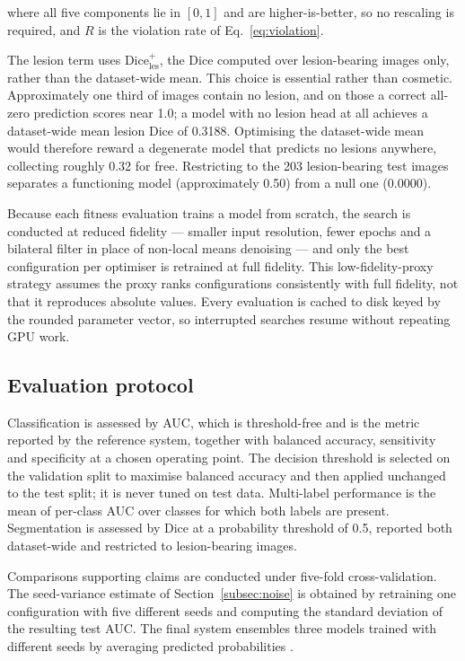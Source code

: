 \documentclass[pdflatex,sn-mathphys-num]{sn-jnl}
\theoremstyle{thmstyleone}%
\theoremstyle{thmstyletwo}%
\theoremstyle{thmstylethree}%
\begin{document}
where all five components lie in $[0,1]$ and are higher-is-better, so no rescaling is required,
and $R$ is the violation rate of Eq.~\eqref{eq:violation}.

The lesion term uses $\mathrm{Dice}^{+}_{\text{les}}$, the Dice computed over lesion-bearing
images only, rather than the dataset-wide mean. This choice is essential rather than cosmetic.
Approximately one third of images contain no lesion, and on those a correct all-zero prediction
scores near 1.0; a model with no lesion head at all achieves a dataset-wide mean lesion Dice of
0.3188. Optimising the dataset-wide mean would therefore reward a degenerate model that predicts
no lesions anywhere, collecting roughly 0.32 for free. Restricting to the 203 lesion-bearing
test images separates a functioning model (approximately 0.50) from a null one (0.0000).

Because each fitness evaluation trains a model from scratch, the search is conducted at reduced
fidelity --- smaller input resolution, fewer epochs and a bilateral filter in place of non-local
means denoising --- and only the best configuration per optimiser is retrained at full fidelity.
This low-fidelity-proxy strategy assumes the proxy ranks configurations consistently with full
fidelity, not that it reproduces absolute values. Every evaluation is cached to disk keyed by the
rounded parameter vector, so interrupted searches resume without repeating GPU work.

\subsection{Evaluation protocol}\label{subsec:evalprotocol}

Classification is assessed by AUC, which is threshold-free and is the metric reported by the
reference system, together with balanced accuracy, sensitivity and specificity at a chosen
operating point. The decision threshold is selected on the validation split to maximise balanced
accuracy and then applied unchanged to the test split; it is never tuned on test data.
Multi-label performance is the mean of per-class AUC over classes for which both labels are
present. Segmentation is assessed by Dice at a probability threshold of 0.5, reported both
dataset-wide and restricted to lesion-bearing images.

Comparisons supporting claims are conducted under five-fold cross-validation. The seed-variance
estimate of Section~\ref{subsec:noise} is obtained by retraining one configuration with five
different seeds and computing the standard deviation of the resulting test AUC. The final system
ensembles three models trained with different seeds by averaging predicted probabilities
\cite{bib_ensembles}.
\end{document}
